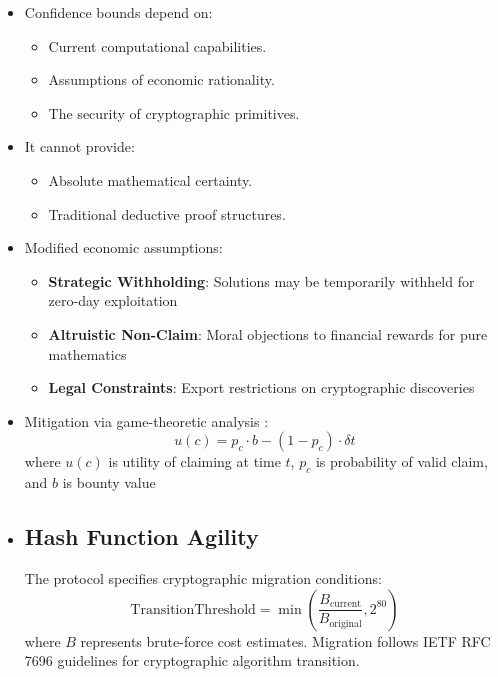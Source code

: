 \documentclass[12pt]{report}
\begin{document}
\begin{itemize}
    \item Confidence bounds depend on:
    \begin{itemize}
        \item Current computational capabilities.
        \item Assumptions of economic rationality.
        \item The security of cryptographic primitives.
    \end{itemize}
    \item It cannot provide:
    \begin{itemize}
        \item Absolute mathematical certainty.
        \item Traditional deductive proof structures.
    \end{itemize}
    \item Modified economic assumptions:
    \begin{itemize}
        \item \textbf{Strategic Withholding}: Solutions may be temporarily withheld for zero-day exploitation
        \item \textbf{Altruistic Non-Claim}: Moral objections to financial rewards for pure mathematics
        \item \textbf{Legal Constraints}: Export restrictions on cryptographic discoveries
    \end{itemize}
    \item Mitigation via game-theoretic analysis \cite{Roughgarden2016}:
    \begin{equation*}
        u(c) = p_c \cdot b - (1-p_c) \cdot \delta t
    \end{equation*}
    where $u(c)$ is utility of claiming at time $t$, $p_c$ is probability of valid claim, and $b$ is bounty value
    \item \subsection{Hash Function Agility}
    The protocol specifies cryptographic migration conditions:
    \begin{equation*}
        \text{TransitionThreshold} = \min\left(\frac{B_{\text{current}}}{B_{\text{original}}}, 2^{80}\right)
    \end{equation*}
    where $B$ represents brute-force cost estimates. Migration follows IETF RFC 7696 \cite{Housley2015} guidelines for cryptographic algorithm transition.

\end{itemize}
\end{document}
